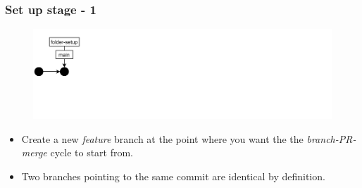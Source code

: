 \documentclass[aspectratio=169]{beamer}
\begin{document}
\begin{frame}
	\frametitle{Set up stage - 1}

	\vspace{-.5cm}
	\begin{minipage}[t][5cm][t]{\textwidth}
		\begin{figure}
			\centering
			\includegraphics[width=\textwidth]{./img/dime-gitflow-network-1-0.png}
		\end{figure}
	\end{minipage}

	\vspace{-.5cm}
	\begin{minipage}[t][5cm][t]{\textwidth}
		\begin{itemize}
			\setlength\itemsep{.5em}
			\item Create a new \textit{feature} branch at the point
			where you want the the \textit{branch-PR-merge} cycle
			to start from.
			\item Two branches pointing to the same commit
			are identical by definition.
		\end{itemize}
	\end{minipage}

\end{frame}
\end{document}
